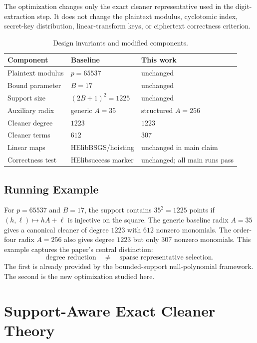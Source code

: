 \documentclass[a4paper,runningheads]{llncs}
\newcommand{\HElib}{\textsf{HElib}}
\begin{document}
The optimization changes only the exact cleaner representative used in the
digit-extraction step.  It does not change the plaintext modulus, cyclotomic
index, secret-key distribution, linear-transform keys, or ciphertext
correctness criterion.

\begin{table}[t]
\centering
\caption{Design invariants and modified components.}
\label{tab:design_invariants}
\begin{tabular}{p{3.5cm}p{4.3cm}p{4.0cm}}
\toprule
\textbf{Component} & \textbf{Baseline} & \textbf{This work} \\
\midrule
Plaintext modulus & $p=65537$ & unchanged \\
Bound parameter & $B=17$ & unchanged \\
Support size & $(2B+1)^2=1225$ & unchanged \\
Auxiliary radix & generic $A=35$ & structured $A=256$ \\
Cleaner degree & $1223$ & $1223$ \\
Cleaner terms & $612$ & $307$ \\
Linear maps & \HElib BSGS/hoisting & unchanged in main claim \\
Correctness test & \HElib success marker & unchanged; all main runs pass \\
\bottomrule
\end{tabular}
\end{table}

\subsection{Running Example}

For $p=65537$ and $B=17$, the support contains $35^2=1225$ points if
$(h,\ell)\mapsto hA+\ell$ is injective on the square.  The generic baseline
radix $A=35$ gives a canonical cleaner of degree $1223$ with $612$ nonzero
monomials.  The order-four radix $A=256$ also gives degree $1223$ but only
$307$ nonzero monomials.  This example captures the paper's central
distinction:
\[
  \text{degree reduction}\quad \neq \quad
  \text{sparse representative selection}.
\]
The first is already provided by the bounded-support null-polynomial
framework.  The second is the new optimization studied here.

\section{Support-Aware Exact Cleaner Theory}
\label{sec:theory}
\end{document}
